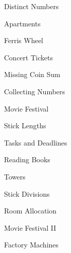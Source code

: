 \begin{practice}
\begin{pplist}
  \item Distinct Numbers
  \item Apartments
  \item Ferris Wheel
  \item Concert Tickets
  \item Missing Coin Sum
  \item Collecting Numbers
\end{pplist}
\begin{pplist}
  \item Movie Festival
  \item Stick Lengths
  \item Tasks and Deadlines
  \item Reading Books
  \item Towers
  \item Stick Divisions
\end{pplist}
\begin{pplist}
  \item Room Allocation
  \item Movie Festival II
  \item Factory Machines
\end{pplist}
\end{practice}
